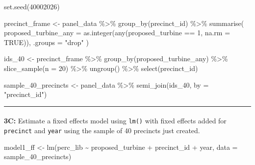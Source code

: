 \documentclass[
  letterpaper,
  DIV=11,
  numbers=noendperiod]{scrartcl}
\makeatletter
\let\oldparagraph\paragraph
\renewcommand{\paragraph}{
    \@ifstar
      \xxxParagraphStar
      \xxxParagraphNoStar
  }
\newcommand{\xxxParagraphStar}[1]{\oldparagraph*{#1}\mbox{}}
\newcommand{\xxxParagraphNoStar}[1]{\oldparagraph{#1}\mbox{}}
\newenvironment{Shaded}{\begin{snugshade}}{\end{snugshade}}
\newcommand{\AttributeTok}[1]{\textcolor[rgb]{0.40,0.45,0.13}{#1}}
\newcommand{\ConstantTok}[1]{\textcolor[rgb]{0.56,0.35,0.01}{#1}}
\newcommand{\DecValTok}[1]{\textcolor[rgb]{0.68,0.00,0.00}{#1}}
\newcommand{\FunctionTok}[1]{\textcolor[rgb]{0.28,0.35,0.67}{#1}}
\newcommand{\NormalTok}[1]{\textcolor[rgb]{0.00,0.23,0.31}{#1}}
\newcommand{\OtherTok}[1]{\textcolor[rgb]{0.00,0.23,0.31}{#1}}
\newcommand{\SpecialCharTok}[1]{\textcolor[rgb]{0.37,0.37,0.37}{#1}}
\newcommand{\StringTok}[1]{\textcolor[rgb]{0.13,0.47,0.30}{#1}}
\makeatother
\begin{document}
\begin{Shaded}
\begin{Highlighting}[]
\FunctionTok{set.seed}\NormalTok{(}\DecValTok{40002026}\NormalTok{)}

\NormalTok{precinct\_frame }\OtherTok{\textless{}{-}}\NormalTok{ panel\_data }\SpecialCharTok{\%\textgreater{}\%}
  \FunctionTok{group\_by}\NormalTok{(precinct\_id) }\SpecialCharTok{\%\textgreater{}\%}
  \FunctionTok{summarise}\NormalTok{(}
    \AttributeTok{proposed\_turbine\_any =} \FunctionTok{as.integer}\NormalTok{(}\FunctionTok{any}\NormalTok{(proposed\_turbine }\SpecialCharTok{==} \DecValTok{1}\NormalTok{, }\AttributeTok{na.rm =} \ConstantTok{TRUE}\NormalTok{)),}
    \AttributeTok{.groups =} \StringTok{"drop"}
\NormalTok{  )}

\NormalTok{ids\_40 }\OtherTok{\textless{}{-}}\NormalTok{ precinct\_frame }\SpecialCharTok{\%\textgreater{}\%}
  \FunctionTok{group\_by}\NormalTok{(proposed\_turbine\_any) }\SpecialCharTok{\%\textgreater{}\%}
  \FunctionTok{slice\_sample}\NormalTok{(}\AttributeTok{n =} \DecValTok{20}\NormalTok{) }\SpecialCharTok{\%\textgreater{}\%}
  \FunctionTok{ungroup}\NormalTok{() }\SpecialCharTok{\%\textgreater{}\%}
  \FunctionTok{select}\NormalTok{(precinct\_id)}

\NormalTok{sample\_40\_precincts }\OtherTok{\textless{}{-}}\NormalTok{ panel\_data }\SpecialCharTok{\%\textgreater{}\%}
  \FunctionTok{semi\_join}\NormalTok{(ids\_40, }\AttributeTok{by =} \StringTok{"precinct\_id"}\NormalTok{)}
\end{Highlighting}
\end{Shaded}

\begin{center}\rule{0.5\linewidth}{0.5pt}\end{center}

\paragraph{\texorpdfstring{\textbf{3C:} Estimate a fixed effects model
using \texttt{lm()} with fixed effects added for \texttt{precinct} and
\texttt{year} using the sample of 40 precincts just
created.}{3C: Estimate a fixed effects model using lm() with fixed effects added for precinct and year using the sample of 40 precincts just created.}}\label{c-estimate-a-fixed-effects-model-using-lm-with-fixed-effects-added-for-precinct-and-year-using-the-sample-of-40-precincts-just-created.}

\begin{Shaded}
\begin{Highlighting}[]
\NormalTok{model1\_ff }\OtherTok{\textless{}{-}} \FunctionTok{lm}\NormalTok{(perc\_lib }\SpecialCharTok{\textasciitilde{}}\NormalTok{ proposed\_turbine }\SpecialCharTok{+} 
\NormalTok{                   precinct\_id }\SpecialCharTok{+} 
\NormalTok{                   year,}
                \AttributeTok{data =}\NormalTok{ sample\_40\_precincts)}
\end{Highlighting}
\end{Shaded}
\end{document}
